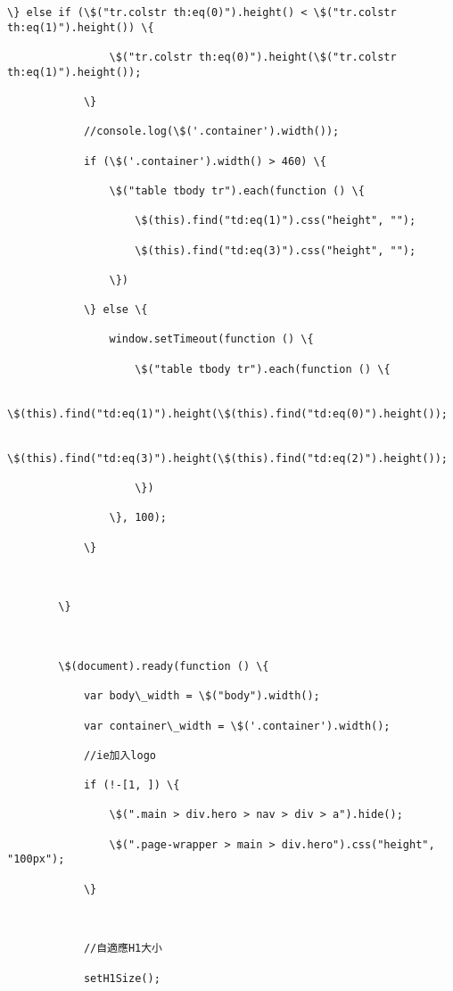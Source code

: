 \documentclass[11pt]{article}
\begin{document}
\begin{Verbatim}[commandchars=\\\{\}]
            \} else if (\$("tr.colstr th:eq(0)").height() < \$("tr.colstr th:eq(1)").height()) \{

                \$("tr.colstr th:eq(0)").height(\$("tr.colstr th:eq(1)").height());

            \}

            //console.log(\$('.container').width());

            if (\$('.container').width() > 460) \{

                \$("table tbody tr").each(function () \{

                    \$(this).find("td:eq(1)").css("height", "");

                    \$(this).find("td:eq(3)").css("height", "");

                \})

            \} else \{

                window.setTimeout(function () \{

                    \$("table tbody tr").each(function () \{

                        \$(this).find("td:eq(1)").height(\$(this).find("td:eq(0)").height());

                        \$(this).find("td:eq(3)").height(\$(this).find("td:eq(2)").height());

                    \})

                \}, 100);

            \}



        \}



        \$(document).ready(function () \{

            var body\_width = \$("body").width();

            var container\_width = \$('.container').width();

            //ie加入logo

            if (!-[1, ]) \{

                \$(".main > div.hero > nav > div > a").hide();

                \$(".page-wrapper > main > div.hero").css("height", "100px");

            \}



            //自適應H1大小

            setH1Size();




\end{Verbatim}
\end{document}
